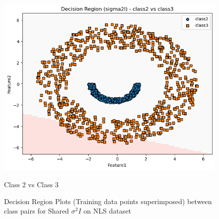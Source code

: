 \begin{figure}[H]
\begin{minipage}{0.32\linewidth}
        \includegraphics[width=\linewidth]{images/NLS_Group04_images/01_sigma2i/04_decision_region_c2_c3.png}
        \caption*{Class 2 vs Class 3}
    \end{minipage}
    \caption{Decision Region Plots (Training data points superimposed) between class pairs for Shared $\sigma^2 I$ on NLS dataset}
\end{figure}